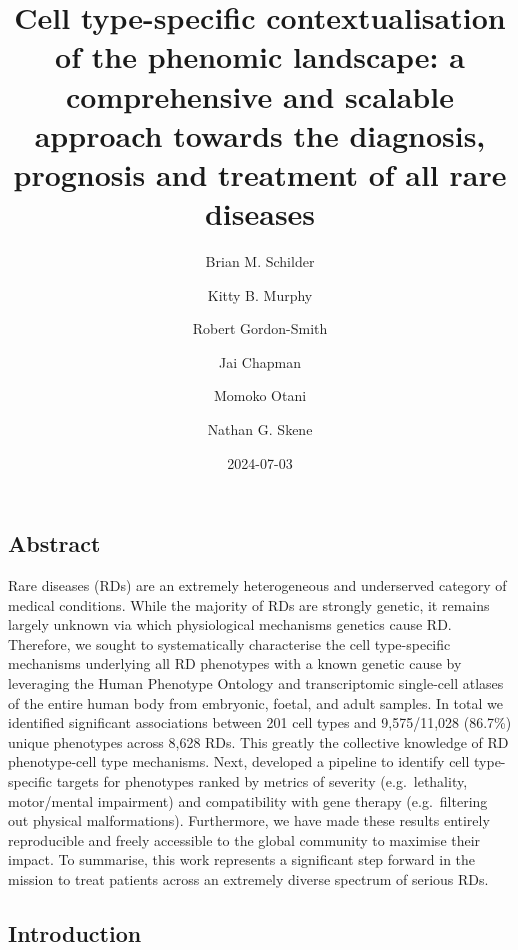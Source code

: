 \documentclass[
]{article}
\title{Cell type-specific contextualisation of the phenomic landscape: a
comprehensive and scalable approach towards the diagnosis, prognosis and
treatment of all rare diseases}
\author{Brian M. Schilder \and Kitty B. Murphy \and Robert
Gordon-Smith \and Jai Chapman \and Momoko Otani \and Nathan G. Skene}
\date{2024-07-03}
\begin{document}
\maketitle

\newpage{}

\subsection{Abstract}\label{abstract}

Rare diseases (RDs) are an extremely heterogeneous and underserved
category of medical conditions. While the majority of RDs are strongly
genetic, it remains largely unknown via which physiological mechanisms
genetics cause RD. Therefore, we sought to systematically characterise
the cell type-specific mechanisms underlying all RD phenotypes with a
known genetic cause by leveraging the Human Phenotype Ontology and
transcriptomic single-cell atlases of the entire human body from
embryonic, foetal, and adult samples. In total we identified significant
associations between 201 cell types and 9,575/11,028 (86.7\%) unique
phenotypes across 8,628 RDs. This greatly the collective knowledge of RD
phenotype-cell type mechanisms. Next, developed a pipeline to identify
cell type-specific targets for phenotypes ranked by metrics of severity
(e.g.~lethality, motor/mental impairment) and compatibility with gene
therapy (e.g.~filtering out physical malformations). Furthermore, we
have made these results entirely reproducible and freely accessible to
the global community to maximise their impact. To summarise, this work
represents a significant step forward in the mission to treat patients
across an extremely diverse spectrum of serious RDs.

\subsection{Introduction}\label{sec-introduction}
\end{document}

